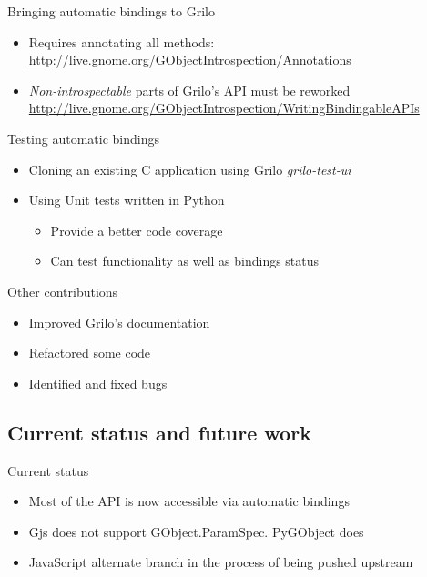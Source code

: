 \documentclass{beamer}
\begin{document}
\begin{frame}{Bringing automatic bindings to Grilo}
\begin{itemize}
  \item Requires annotating all methods: \url{http://live.gnome.org/GObjectIntrospection/Annotations}
  \item {\it Non-introspectable} parts of Grilo's API must be reworked \url{http://live.gnome.org/GObjectIntrospection/WritingBindingableAPIs}
\end{itemize}
\end{frame}

\begin{frame}{Testing automatic bindings}
\begin{itemize}
  \item Cloning an existing C application using Grilo {\it grilo-test-ui}
  \item Using Unit tests written in Python
  \begin{itemize}
    \item Provide a better code coverage
    \item Can test functionality as well as bindings status
  \end{itemize}
\end{itemize}
\end{frame}

\begin{frame}{Other contributions}
\begin{itemize}
  \item Improved Grilo's documentation
  \item Refactored some code
  \item Identified and fixed bugs
\end{itemize}
\end{frame}

\subsection{Current status and future work}

\begin{frame}{Current status}
\begin{itemize}
  \item Most of the API is now accessible via automatic bindings
  \item Gjs does not support GObject.ParamSpec. PyGObject does
  \item JavaScript alternate branch in the process of being pushed upstream
\end{itemize}
\end{frame}
\end{document}
